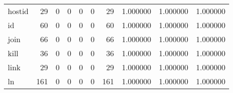 \begin{tabular}{lrrrrrrrrr}
hostid    &                                        29 &                                                  0 &                                                  0 &                                                  0 &                                                  0 &                                                 29 &                                           1.000000 &                               1.000000 &                             1.000000 \\
id        &                                        60 &                                                  0 &                                                  0 &                                                  0 &                                                  0 &                                                 60 &                                           1.000000 &                               1.000000 &                             1.000000 \\
join      &                                        66 &                                                  0 &                                                  0 &                                                  0 &                                                  0 &                                                 66 &                                           1.000000 &                               1.000000 &                             1.000000 \\
kill      &                                        36 &                                                  0 &                                                  0 &                                                  0 &                                                  0 &                                                 36 &                                           1.000000 &                               1.000000 &                             1.000000 \\
link      &                                        29 &                                                  0 &                                                  0 &                                                  0 &                                                  0 &                                                 29 &                                           1.000000 &                               1.000000 &                             1.000000 \\
ln        &                                       161 &                                                  0 &                                                  0 &                                                  0 &                                                  0 &                                                161 &                                           1.000000 &                               1.000000 &                             1.000000 \\

\end{tabular}
